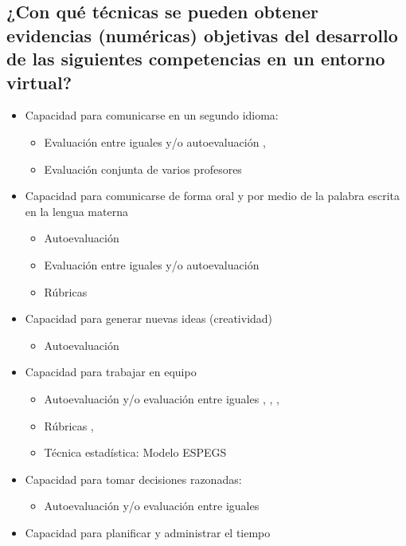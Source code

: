 \subsection{¿Con qué técnicas se pueden obtener evidencias (numéricas) objetivas del desarrollo de las siguientes competencias en un entorno virtual?}
\begin{itemize}
\item Capacidad para comunicarse en un segundo idioma:
	\begin{itemize} 
	\item Evaluación entre iguales y/o autoevaluación \cite{Shih:2011}, \cite{Masip-Alvarez:2013}
	\item Evaluación conjunta de varios profesores \cite{MercedesRico:2013}
	\end{itemize}
\item Capacidad para comunicarse de forma oral y por medio de la palabra escrita en la lengua materna
	\begin{itemize} 
	\item Autoevaluación \cite{Liao:2013}
	\item Evaluación entre iguales y/o autoevaluación \cite{Masip-Alvarez:2013}
	\item Rúbricas \cite{Mohamed:2008}
	\end{itemize}
\item Capacidad para generar nuevas ideas (creatividad)
	\begin{itemize} 
	\item Autoevaluación \cite{Liao:2013}
	\end{itemize}
\item Capacidad para trabajar en equipo
	\begin{itemize} 
	\item Autoevaluación y/o evaluación entre iguales \cite{McMahon:2007}, \cite{Lim:2011}, \cite{Masip-Alvarez:2013}, \cite{Liao:2013}
	\item Rúbricas \cite{Mohamed:2008}, \cite{Piedra:2010}
	\item Técnica estadística: Modelo ESPEGS \cite{Rashid:2008}
	\end{itemize}
\item Capacidad para tomar decisiones razonadas:
	\begin{itemize} 
	\item Autoevaluación y/o evaluación entre iguales \cite{Achcaoucaou:2012}
	\end{itemize}
\item Capacidad para planificar y administrar el tiempo

\end{itemize}
